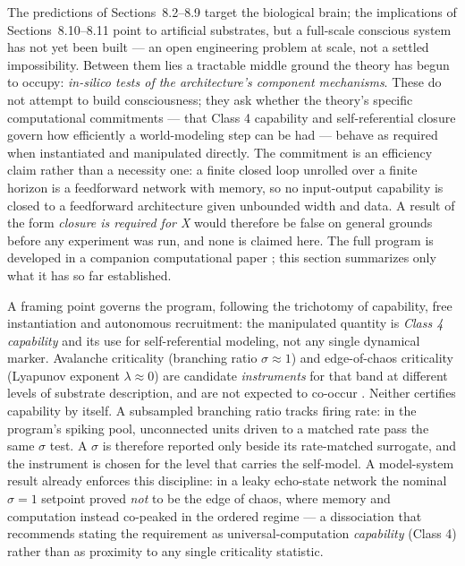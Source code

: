 \documentclass[12pt]{article}
\begin{document}
The predictions of Sections~8.2--8.9 target the biological brain; the implications of Sections~8.10--8.11 point to artificial substrates, but a full-scale conscious system has not yet been built --- an open engineering problem at scale, not a settled impossibility. Between them lies a tractable middle ground the theory has begun to occupy: \emph{in-silico tests of the architecture's component mechanisms}. These do not attempt to build consciousness; they ask whether the theory's specific computational commitments --- that Class 4 capability and self-referential closure govern how efficiently a world-modeling step can be had --- behave as required when instantiated and manipulated directly. The commitment is an efficiency claim rather than a necessity one: a finite closed loop unrolled over a finite horizon is a feedforward network with memory, so no input-output capability is closed to a feedforward architecture given unbounded width and data. A result of the form \emph{closure is required for X} would therefore be false on general grounds before any experiment was run, and none is claimed here. The full program is developed in a companion computational paper \citep{Gruber2026d}; this section summarizes only what it has so far established.

A framing point governs the program, following the trichotomy of capability, free instantiation and autonomous recruitment: the manipulated quantity is \emph{Class 4 capability} and its use for self-referential modeling, not any single dynamical marker. Avalanche criticality (branching ratio $\sigma \approx 1$) and edge-of-chaos criticality (Lyapunov exponent $\lambda \approx 0$) are candidate \emph{instruments} for that band at different levels of substrate description, and are not expected to co-occur \citep{Kanders2017}. Neither certifies capability by itself. A subsampled branching ratio tracks firing rate: in the program's spiking pool, unconnected units driven to a matched rate pass the same $\sigma$ test. A $\sigma$ is therefore reported only beside its rate-matched surrogate, and the instrument is chosen for the level that carries the self-model. A model-system result already enforces this discipline: in a leaky echo-state network the nominal $\sigma = 1$ setpoint proved \emph{not} to be the edge of chaos, where memory and computation instead co-peaked in the ordered regime --- a dissociation that recommends stating the requirement as universal-computation \emph{capability} (Class 4) rather than as proximity to any single criticality statistic.
\end{document}
